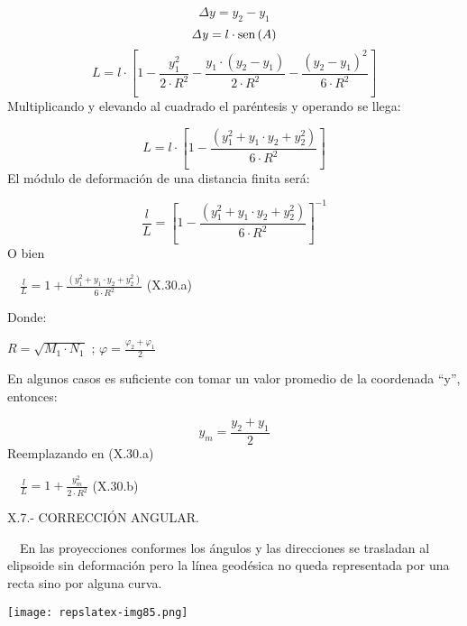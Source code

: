 \documentclass{tufte-book}
\newcommand\normalsubformula[1]{\text{\mathversion{normal}$#1$}}
\begin{document}
\begin{equation*}
{\mathit{\Delta y}=y_{{2}}-y_{{1}}}
\end{equation*}
\begin{equation*}
{\mathit{\Delta y}=l\cdot \normalsubformula{\text{sen}}\left(A\right)}
\end{equation*}
\begin{equation*}
{L=l\cdot \left[1-\frac{y_{{1}}^{{2}}}{2\cdot
R^{{2}}}-\frac{y_{{1}}\cdot \left(y_{{2}}-y_{{1}}\right)}{2\cdot
R^{{2}}}-\frac{\left(y_{{2}}-y_{{1}}\right)^{{2}}}{6\cdot
R^{{2}}}\right]}
\end{equation*}
Multiplicando y elevando al cuadrado el paréntesis y operando se
llega:

\begin{equation*}
{L=l\cdot \left[1-\frac{\left(y_{{1}}^{{2}}+y_{{1}}\cdot
y_{{2}}+y_{{2}}^{{2}}\right)}{6\cdot R^{{2}}}\right]}
\end{equation*}
El módulo de deformación de una distancia finita será:

\begin{equation*}
{\frac{l}{L}=\left[1-\frac{\left(y_{{1}}^{{2}}+y_{{1}}\cdot
y_{{2}}+y_{{2}}^{{2}}\right)}{6\cdot R^{{2}}}\right]^{{-1}}}
\end{equation*}
O bien

\ \  ${\frac{l}{L}=1+\frac{\left(y_{{1}}^{{2}}+y_{{1}}\cdot
y_{{2}}+y_{{2}}^{{2}}\right)}{6\cdot R^{{2}}}}$  (X.30.a)

Donde:

 ${R=\sqrt{M_{{1}}\cdot N_{{1}}}}$  ;   ${\varphi =\frac{\varphi
_{{2}}+\varphi _{{1}}}{2}}$

En algunos casos es suficiente con tomar un valor promedio de la
coordenada {\textquotedblleft}y{\textquotedblright}, entonces:

\begin{equation*}
{y_{{m}}=\frac{y_{{2}}+y_{{1}}}{2}}
\end{equation*}
Reemplazando en (X.30.a)

\ \  ${\frac{l}{L}=1+\frac{y_{{m}}^{{2}}}{2\cdot R^{{2}}}}$  (X.30.b)

X.7.- CORRECCIÓN ANGULAR.

\ \ En las proyecciones conformes los ángulos y las direcciones se
trasladan al elipsoide sin deformación pero la línea geodésica no
queda representada por una recta sino por alguna curva.

\begin{marginfigure}
\texttt{[image: repslatex-img85.png]}
\end{marginfigure}
 
\end{document}
